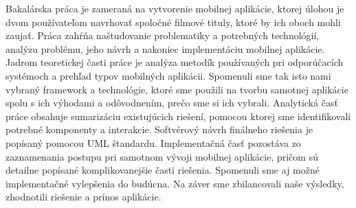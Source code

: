 Bakalárska práca je zameraná na vytvorenie mobilnej aplikácie, ktorej úlohou je dvom používateľom navrhovať spoločné filmové tituly, ktoré by ich oboch mohli zaujať. Práca zahŕňa naštudovanie problematiky a potrebných technológií, analýzu problému, jeho návrh a nakoniec implementáciu mobilnej aplikácie.
Jadrom teoretickej časti práce je analýza metodík používaných pri odporúčacích systémoch a prehľad typov mobilných aplikácii. Spomenuli sme tak isto nami vybraný framework a technológie, ktoré sme použili na tvorbu samotnej aplikácie spolu s ich výhodami a odôvodnením, prečo sme si ich vybrali. Analytická časť práce obsahuje sumarizáciu existujúcich riešení, pomocou ktorej sme identifikovali potrebné komponenty a interakcie. Softvérový návrh finálneho riešenia je popísaný pomocou UML štandardu.
Implementačná časť pozostáva zo zaznamenania postupu pri samotnom vývoji mobilnej aplikácie, pričom sú detailne popísané komplikovanejšie časti riešenia. Spomenuli sme aj možné implementačné vylepšenia do budúcna. Na záver sme zbilancovali naše výsledky, zhodnotili riešenie a prínos aplikácie. 
